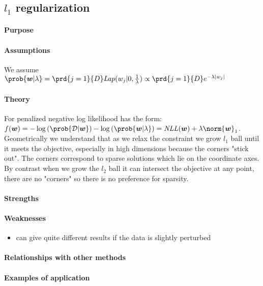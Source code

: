 \subsection{$l_{1}$ regularization}
\paragraph{Purpose}

\paragraph{Assumptions}
We assume $\prob{\bm{w}|\lambda} = \prd{j=1}{D}\text{\emph{Lap}}(w_{j}|0,
\frac{1}{\lambda}) \propto \prd{j=1}{D}e^{-\lambda|w_{j}|}$
\paragraph{Theory}
For penalized negative log likelihood has the form: $f(\bm{w}) = -\log\left(\prob{
\mathcal{D}|\bm{w}}\right) - \log\left(\prob{\bm{w}|\lambda}\right) = \text{\emph{NLL}}
(\bm{w}) + \lambda\norm{\bm{w}}_{1}$.\\
Geometrically we understand that as we relax the constraint we grow $l_{1}$ ball until
it meets the objective,  especially in high dimensions because the corners "stick
out". The corners correspond to sparse solutions which lie on the coordinate axes. By
contrast when we grow the $l_{2}$ ball it can intersect the objective at any point, 
there are no "corners" so there is no preference for sparsity. 
\paragraph{Strengths}

\paragraph{Weaknesses}
\begin{itemize}
    \item can give quite different results if the data is slightly perturbed
\end{itemize}
\paragraph{Relationships with other methods}
\paragraph{Examples of application}

